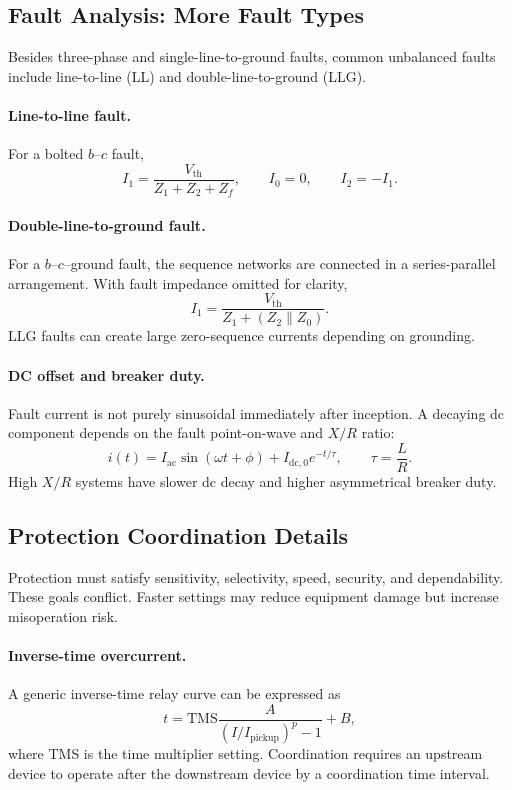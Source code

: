 \documentclass[11pt]{article}
\begin{document}
\subsection{Fault Analysis: More Fault Types}
Besides three-phase and single-line-to-ground faults, common unbalanced faults
include line-to-line (LL) and double-line-to-ground (LLG).

\paragraph{Line-to-line fault.}
For a bolted $b$--$c$ fault,
\begin{equation}
I_1=\frac{V_{\mathrm{th}}}{Z_1+Z_2+Z_f},\qquad I_0=0,\qquad I_2=-I_1.
\end{equation}

\paragraph{Double-line-to-ground fault.}
For a $b$--$c$--ground fault, the sequence networks are connected in a
series-parallel arrangement. With fault impedance omitted for clarity,
\begin{equation}
I_1=\frac{V_{\mathrm{th}}}{Z_1+\left(Z_2\parallel Z_0\right)}.
\end{equation}
LLG faults can create large zero-sequence currents depending on grounding.

\paragraph{DC offset and breaker duty.}
Fault current is not purely sinusoidal immediately after inception. A decaying
dc component depends on the fault point-on-wave and $X/R$ ratio:
\begin{equation}
i(t)=I_{\mathrm{ac}}\sin(\omega t+\phi)+I_{\mathrm{dc},0}e^{-t/\tau},
\qquad \tau=\frac{L}{R}.
\end{equation}
High $X/R$ systems have slower dc decay and higher asymmetrical breaker duty.

\subsection{Protection Coordination Details}
Protection must satisfy sensitivity, selectivity, speed, security, and
dependability. These goals conflict. Faster settings may reduce equipment damage
but increase misoperation risk.

\paragraph{Inverse-time overcurrent.}
A generic inverse-time relay curve can be expressed as
\begin{equation}
t=\mathrm{TMS}\frac{A}{(I/I_{\mathrm{pickup}})^p-1}+B,
\end{equation}
where TMS is the time multiplier setting. Coordination requires an upstream
device to operate after the downstream device by a coordination time interval.
\end{document}
